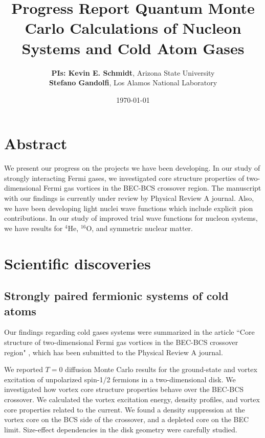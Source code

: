 \documentclass[12pt,letterpaper]{article}
\newcommand{\project}{\large Progress Report \vskip 0.1cm}
\begin{document}
\onehalfspacing
\title{\project {\Large \textbf{Quantum Monte Carlo Calculations of Nucleon 
Systems and Cold Atom Gases}} \vspace{-0.5cm}}
\author{
{\bf PIs: Kevin E. Schmidt}, Arizona State University \\
{\bf Stefano Gandolfi}, Los Alamos National Laboratory
}
\date{\today}
\maketitle

\vspace{-1.5cm}
\section*{Abstract}

We present our progress on the projects we have been developing. In our study 
of strongly interacting Fermi gases, we investigated core structure properties 
of two-dimensional Fermi gas vortices
in the BEC-BCS crossover region. The manuscript with our findings is currently 
under review by Physical Review A journal. Also, we have been developing light 
nuclei wave functions which include explicit pion contributions. In our study 
of improved trial wave functions for nucleon systems, we have results for 
$^4$He, $^{16}$O, and symmetric nuclear matter.

\section{Scientific discoveries}%

\subsection{Strongly paired fermionic systems of cold atoms}

Our findings regarding cold gases systems were summarized in the article
``Core structure of two-dimensional Fermi gas vortices
in the BEC-BCS crossover region" \cite{mad17}, which has been submitted to the 
Physical 
Review A journal.

We reported $T=0$ diffusion Monte Carlo results for 
the ground-state and vortex excitation of unpolarized spin-1/2 fermions 
in a two-dimensional disk. We investigated how vortex core structure 
properties behave over the BEC-BCS crossover. We calculated the vortex 
excitation energy, density profiles, and vortex core properties related 
to the current. We found a density suppression at the vortex core on 
the BCS side of the crossover, and a depleted core on the BEC limit. 
Size-effect dependencies in the disk geometry were carefully studied.
\end{document}
